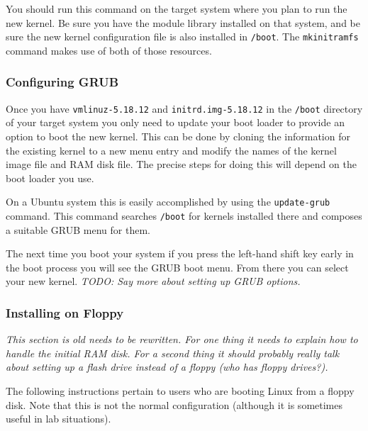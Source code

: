 \documentclass{article}
\newcommand{\command}[1]{\texttt{#1}}
\newcommand{\filename}[1]{\texttt{#1}}
\newcommand{\todo}[1]{\textit{TODO: #1}}
\begin{document}
You should run this command on the target system where you plan to run the new kernel. Be sure
you have the module library installed on that system, and be sure the new kernel configuration
file is also installed in \filename{/boot}. The \command{mkinitramfs} command makes use of both
of those resources.

\subsubsection{Configuring GRUB}

Once you have \filename{vmlinuz-5.18.12} and \filename{initrd.img-5.18.12} in the
\filename{/boot} directory of your target system you only need to update your boot loader to
provide an option to boot the new kernel. This can be done by cloning the information for the
existing kernel to a new menu entry and modify the names of the kernel image file and RAM disk
file. The precise steps for doing this will depend on the boot loader you use.

On a Ubuntu system this is easily accomplished by using the \command{update-grub} command. This
command searches \filename{/boot} for kernels installed there and composes a suitable GRUB menu
for them.

The next time you boot your system if you press the left-hand shift key early in the boot
process you will see the GRUB boot menu. From there you can select your new kernel. \todo{Say
  more about setting up GRUB options.}

\subsubsection{Installing on Floppy}

\textit{This section is old needs to be rewritten. For one thing it needs to explain how to
handle the initial RAM disk. For a second thing it should probably really talk about setting up
a flash drive instead of a floppy (who has floppy drives?).}

The following instructions pertain to users who are booting Linux from a floppy disk. Note that
this is not the normal configuration (although it is sometimes useful in lab situations).
\end{document}
